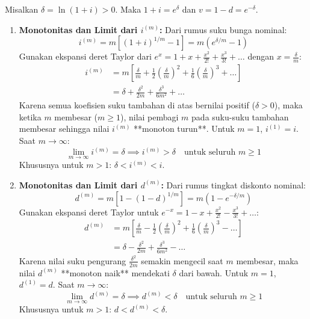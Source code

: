 \documentclass[11pt,a4paper]{article}
\begin{document}
\begin{solutionbox}[Soal 8]
Misalkan $\delta = \ln(1+i) > 0$. Maka $1 + i = e^\delta$ dan $v = 1 - d = e^{-\delta}$.
\begin{enumerate}[label=(\alph*)]
    \item \textbf{Monotonitas dan Limit dari $i^{(m)}$:}
    Dari rumus suku bunga nominal:
    \begin{equation*}
        i^{(m)} = m\left[(1+i)^{1/m} - 1\right] = m\left(e^{\delta/m} - 1\right)
    \end{equation*}
    Gunakan ekspansi deret Taylor dari $e^x = 1 + x + \frac{x^2}{2!} + \frac{x^3}{3!} + \dots$ dengan $x = \frac{\delta}{m}$:
    \begin{align*}
        i^{(m)} &= m \left[ \frac{\delta}{m} + \frac{1}{2}\left(\frac{\delta}{m}\right)^2 + \frac{1}{6}\left(\frac{\delta}{m}\right)^3 + \dots \right] \\
                &= \delta + \frac{\delta^2}{2m} + \frac{\delta^3}{6m^2} + \dots
    \end{align*}
    Karena semua koefisien suku tambahan di atas bernilai positif ($\delta > 0$), maka ketika $m$ membesar ($m \ge 1$), nilai pembagi $m$ pada suku-suku tambahan membesar sehingga nilai $i^{(m)}$ **monoton turun**. Untuk $m = 1$, $i^{(1)} = i$. Saat $m \to \infty$:
    \begin{equation*}
        \lim_{m \to \infty} i^{(m)} = \delta \implies i^{(m)} > \delta \quad \text{untuk seluruh } m \ge 1
    \end{equation*}
    Khususnya untuk $m > 1$: $\delta < i^{(m)} < i$.

    \item \textbf{Monotonitas dan Limit dari $d^{(m)}$:}
    Dari rumus tingkat diskonto nominal:
    \begin{equation*}
        d^{(m)} = m\left[1 - (1-d)^{1/m}\right] = m\left(1 - e^{-\delta/m}\right)
    \end{equation*}
    Gunakan ekspansi deret Taylor untuk $e^{-x} = 1 - x + \frac{x^2}{2!} - \frac{x^3}{3!} + \dots$:
    \begin{align*}
        d^{(m)} &= m \left[ \frac{\delta}{m} - \frac{1}{2}\left(\frac{\delta}{m}\right)^2 + \frac{1}{6}\left(\frac{\delta}{m}\right)^3 - \dots \right] \\
                &= \delta - \frac{\delta^2}{2m} + \frac{\delta^3}{6m^2} - \dots
    \end{align*}
    Karena nilai suku pengurang $\frac{\delta^2}{2m}$ semakin mengecil saat $m$ membesar, maka nilai $d^{(m)}$ **monoton naik** mendekati $\delta$ dari bawah. Untuk $m = 1$, $d^{(1)} = d$. Saat $m \to \infty$:
    \begin{equation*}
        \lim_{m \to \infty} d^{(m)} = \delta \implies d^{(m)} < \delta \quad \text{untuk seluruh } m \ge 1
    \end{equation*}
    Khususnya untuk $m > 1$: $d < d^{(m)} < \delta$.


\end{enumerate}
\end{solutionbox}
\end{document}
